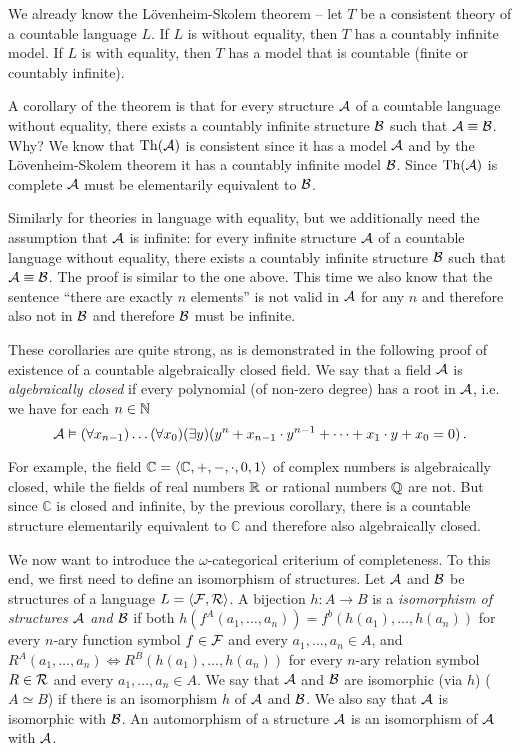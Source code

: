 We already know the Lövenheim-Skolem theorem -- let $T$ be a consistent theory of a countable language $L$. If $L$ is without equality, then $T$ has a countably infinite model. If $L$ is with equality, then $T$ has a model that is countable (finite or countably infinite). 

A corollary of the theorem is that for every structure $\mathcal{A}$ of a countable language without equality, there exists a countably infinite structure $\mathcal{B}$ such that $\mathcal{A} \equiv \mathcal{B}$. Why? We know that $\operatorname{Th}(\mathcal{A})$ is consistent since it has a model $\mathcal{A}$ and by the Lövenheim-Skolem theorem it has a countably infinite model $\mathcal{B}$. Since $\operatorname{Th}(\mathcal{A})$ is complete $\mathcal{A}$ must be elementarily equivalent to $\mathcal{B}$.

Similarly for theories in language with equality, but we additionally need the assumption that $\mathcal{A}$ is infinite: for every infinite structure $\mathcal{A}$ of a countable language without equality, there exists a countably infinite structure $\mathcal{B}$ such that $\mathcal{A} \equiv \mathcal{B}$. The proof is similar to the one above. This time we also know that the sentence ``there are exactly $n$ elements'' is not valid in $\mathcal{A}$ for any $n$ and therefore also not in $\mathcal{B}$ and therefore $\mathcal{B}$ must be infinite.

These corollaries are quite strong, as is demonstrated in the following proof of existence of a countable algebraically closed field. We say that a field $\mathcal{A}$ is \emph{algebraically closed} if every polynomial (of non-zero degree) has a root in $\mathcal{A}$, i.e. we have for each $n \in \mathbb{N}$ $$\mathcal{A} \vDash (\forall x_{n-1})\dots(\forall x_0)(\exists y)(y^n + x_{n-1}\cdot y^{n-1} + \dots + x_1\cdot y + x_0 = 0)\,.$$

For example, the field $\mathbb{C} = \langle \mathbb{C}, +, -, \cdot, 0, 1 \rangle$ of complex numbers is algebraically closed, while the fields of real numbers ${\mathbb{R}}$ or rational numbers $\mathbb{Q}$ are not. But since $\mathbb{C}$ is closed and infinite, by the previous corollary, there is a countable structure elementarily equivalent to $\mathbb{C}$ and therefore also algebraically closed.

We now want to introduce the $\omega$-categorical criterium of completeness. To this end, we first need to define an isomorphism of structures. Let $\mathcal{A}$ and $\mathcal{B}$ be structures of a language $L = \langle \mathcal{F}, \mathcal{R} \rangle$. A bijection $h: A \to B$ is a \emph{isomorphism of structures $\mathcal{A}$ and $\mathcal{B}$} if both $h(f^A(a_1, \dots, a_n)) = f^b(h(a_1), \dots, h(a_n))$ for every $n$-ary function symbol $f \in \mathcal{F}$ and every $a_1, \dots, a_n \in A$, and $R^A(a_1, \dots, a_n) \Leftrightarrow R^B(h(a_1), \dots, h(a_n))$ for every $n$-ary relation symbol $R \in \mathcal{R}$ and every $a_1, \dots, a_n \in A$. We say that $\mathcal{A}$ and $\mathcal{B}$ are isomorphic (via $h$) ($A \simeq B$) if there is an isomorphism $h$ of $\mathcal{A}$ and $\mathcal{B}$. We also say that $\mathcal{A}$ is isomorphic with $\mathcal{B}$. An automorphism of a structure $\mathcal{A}$ is an isomorphism of $\mathcal{A}$ with $\mathcal{A}$. 

